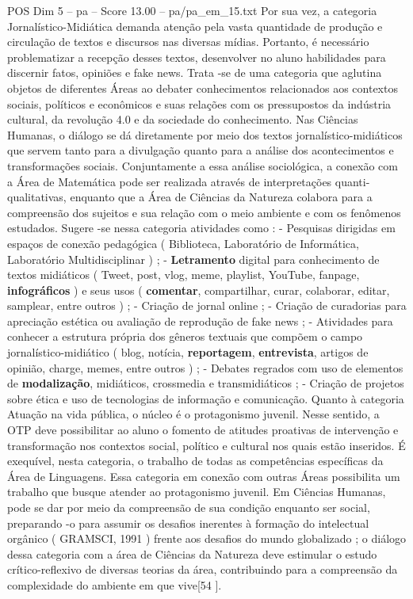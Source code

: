 \begin{textsample}{POS Dim 5 – pa – Score 13.00 – pa/pa\_em\_15.txt}
Por sua vez, a categoria Jornalístico-Midiática demanda atenção pela vasta quantidade de produção e circulação de textos e discursos nas diversas mídias.
Portanto, é necessário problematizar a recepção desses textos, desenvolver no aluno habilidades para discernir fatos, opiniões e fake news.
Trata -se de uma categoria que aglutina objetos de diferentes Áreas ao debater conhecimentos relacionados aos contextos sociais, políticos e econômicos e suas relações com os pressupostos da indústria cultural, da revolução 4.0 e da sociedade do conhecimento.
Nas Ciências Humanas, o diálogo se dá diretamente por meio dos textos jornalístico-midiáticos que servem tanto para a divulgação quanto para a análise dos acontecimentos e transformações sociais.
Conjuntamente a essa análise sociológica, a conexão com a Área de Matemática pode ser realizada através de interpretações quanti-qualitativas, enquanto que a Área de Ciências da Natureza colabora para a compreensão dos sujeitos e sua relação com o meio ambiente e com os fenômenos estudados.
Sugere -se nessa categoria atividades como : - Pesquisas dirigidas em espaços de conexão pedagógica ( Biblioteca, Laboratório de Informática, Laboratório Multidisciplinar ) ; - \textbf{Letramento} digital para conhecimento de textos midiáticos ( Tweet, post, vlog, meme, playlist, YouTube, fanpage, \textbf{infográficos} ) e seus usos ( \textbf{comentar}, compartilhar, curar, colaborar, editar, samplear, entre outros ) ; - Criação de jornal online ; - Criação de curadorias para apreciação estética ou avaliação de reprodução de fake news ; - Atividades para conhecer a estrutura própria dos gêneros textuais que compõem o campo jornalístico-midiático ( blog, notícia, \textbf{reportagem}, \textbf{entrevista}, artigos de opinião, charge, memes, entre outros ) ; - Debates regrados com uso de elementos de \textbf{modalização}, midiáticos, crossmedia e transmidiáticos ; - Criação de projetos sobre ética e uso de tecnologias de informação e comunicação.
Quanto à categoria Atuação na vida pública, o núcleo é o protagonismo juvenil.
Nesse sentido, a OTP deve possibilitar ao aluno o fomento de atitudes proativas de intervenção e transformação nos contextos social, político e cultural nos quais estão inseridos.
É exequível, nesta categoria, o trabalho de todas as competências específicas da Área de Linguagens.
Essa categoria em conexão com outras Áreas possibilita um trabalho que busque atender ao protagonismo juvenil.
Em Ciências Humanas, pode se dar por meio da compreensão de sua condição enquanto ser social, preparando -o para assumir os desafios inerentes à formação do intelectual orgânico ( GRAMSCI, 1991 ) frente aos desafios do mundo globalizado ; o diálogo dessa categoria com a área de Ciências da Natureza deve estimular o estudo crítico-reflexivo de diversas teorias da área, contribuindo para a compreensão da complexidade do ambiente em que vive[54 ].

\end{textsample}
